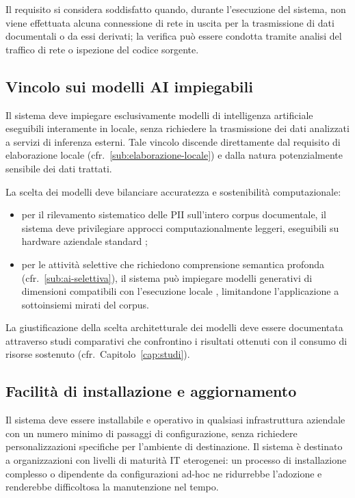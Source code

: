 Il requisito si considera soddisfatto quando, durante l'esecuzione del sistema, non viene effettuata alcuna connessione di rete in uscita per la trasmissione di dati documentali o da essi derivati; la verifica può essere condotta tramite analisi del traffico di rete o ispezione del codice sorgente.

\subsection{Vincolo sui modelli AI impiegabili}
\label{sub:vincolo-ai}
Il sistema deve impiegare esclusivamente modelli di intelligenza artificiale eseguibili interamente in locale, senza richiedere la trasmissione dei dati analizzati a servizi di inferenza esterni. Tale vincolo discende direttamente dal requisito di elaborazione locale (cfr.~\ref{sub:elaborazione-locale}) e dalla natura potenzialmente sensibile dei dati trattati. \medskip

La scelta dei modelli deve bilanciare accuratezza e sostenibilità computazionale:
\begin{itemize}
	\item per il rilevamento sistematico delle PII sull'intero corpus documentale, il sistema deve privilegiare approcci computazionalmente leggeri, eseguibili su hardware aziendale standard \cite{gultekinEnergybasedComparativeAnalysis2024, zschacheComparingEnergyConsumption2026};
	\item per le attività selettive che richiedono comprensione semantica profonda (cfr.~\ref{sub:ai-selettiva}), il sistema può impiegare modelli generativi di dimensioni compatibili con l'esecuzione locale \cite{yangExploringApplicationLarge2023}, limitandone l'applicazione a sottoinsiemi mirati del corpus.
\end{itemize} \medskip

La giustificazione della scelta architetturale dei modelli deve essere documentata attraverso studi comparativi che confrontino i risultati ottenuti con il consumo di risorse sostenuto (cfr.~Capitolo~\ref{cap:studi}).

\subsection{Facilità di installazione e aggiornamento}
\label{sub:facilita-installazione}
Il sistema deve essere installabile e operativo in qualsiasi infrastruttura aziendale con un numero minimo di passaggi di configurazione, senza richiedere personalizzazioni specifiche per l'ambiente di destinazione. Il sistema è destinato a organizzazioni con livelli di maturità IT eterogenei: un processo di installazione complesso o dipendente da configurazioni ad-hoc ne ridurrebbe l'adozione e renderebbe difficoltosa la manutenzione nel tempo. \medskip

